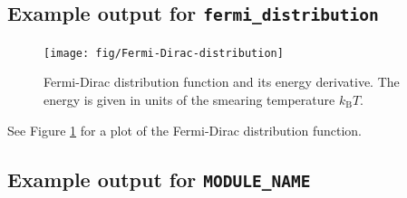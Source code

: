 \documentclass[oribibl]{llncs}
\newcommand{\um}[1]{_{\mathrm{#1}}}
\newcommand{\ttt}[1]{\texttt{#1}}
\begin{document}
\subsection{Example output for \ttt{fermi\_distribution}} \label{sec:example-output-for-fermi-distribution}
%
\begin{figure}[h]
	\centering
	\texttt{[image: fig/Fermi-Dirac-distribution]}
	\label{fig:Fermi-Dirac-distribution}
	\caption{Fermi-Dirac distribution function and its energy derivative.
		     The energy is given in units of the smearing temperature $k\um{B}T$.
	         }
\end{figure}
%
See Figure \ref{fig:Fermi-Dirac-distribution} for a plot of the Fermi-Dirac distribution function.

\newpage

\subsection{Example output for \ttt{MODULE\_NAME}} \label{sec:example-output-for-MODULE-NAME}
%
\small
\begin{verbatim}
\end{verbatim}
\normalsize



\newpage
 

\end{document}
